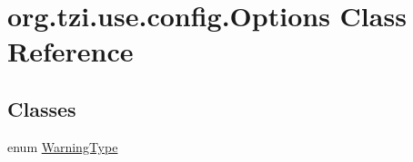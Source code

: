 \hypertarget{classorg_1_1tzi_1_1use_1_1config_1_1_options}{\section{org.\-tzi.\-use.\-config.\-Options Class Reference}
\label{classorg_1_1tzi_1_1use_1_1config_1_1_options}
}
\subsection*{Classes}
\begin{DoxyCompactItemize}
\item 
enum \hyperlink{enumorg_1_1tzi_1_1use_1_1config_1_1_options_1_1_warning_type}{Warning\-Type}
\end{DoxyCompactItemize}
